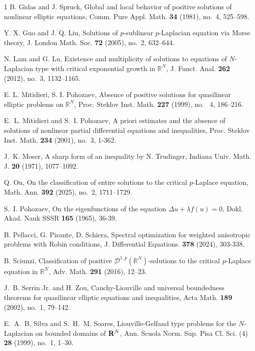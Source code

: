 \documentclass[reqno, 11pt]{amsart} %
\numberwithin{equation}{section}
\theoremstyle{definition}
\begin{document}
\begin{thebibliography}{1}
	B. Gidas and J. Spruck, Global and local behavior of positive solutions of nonlinear elliptic equations, Comm. Pure Appl. Math. {\bf 34} (1981), no.~4, 525--598.

     Y. X. Guo and J. Q. Liu, Solutions of $p$-sublinear $p$-Laplacian equation via Morse theory, J. London Math. Soc. {\bf 72} (2005), no.~2, 632--644.

     N. Lam and G. Lu, Existence and multiplicity of solutions to equations of $N$-Laplacian type with critical exponential growth in $\mathbb{R}^N$, J. Funct. Anal. {\bf 262} (2012), no.~3, 1132--1165.

     E. L. Mitidieri, S. I. Pohozaev, Absence of positive solutions for quasilinear elliptic problems on $\mathbb{R}^N$, Proc. Steklov Inst. Math. {\bf 227 } (1999), no. ~4, 186–216.

     E.~L. Mitidieri and S.~I. Pohozaev, A priori estimates and the absence of solutions of nonlinear partial differential equations and inequalities, Proc. Steklov Inst. Math. {\bf 234} (2001), no.~3, 1-362.

    J.~K. Moser, A sharp form of an inequality by N. Trudinger, Indiana Univ. Math. J. {\bf 20} (1971), 1077--1092.

     Q. Ou, On the classification of entire solutions to the critical $p$-Laplace equation, Math. Ann. {\bf 392} (2025), no.~2, 1711--1729.

    S.~I. Pohozaev, On the eigenfunctions of the equation $\Delta u+\lambda f(u)=0$, Dokl. Akad. Nauk SSSR {\bf 165} (1965), 36-39.

     B. Pellacci, G. Pisante, D. Schiera, Spectral optimization for weighted anisotropic problems with Robin conditions, J. Differential Equations.  {\bf 378} (2024), 303-338.

     B. Sciunzi, Classification of positive $\mathcal{D}^{1,p}(\mathbb{R}^N)$-solutions to the critical $p$-Laplace equation in $\mathbb{R}^N$, Adv. Math. {\bf 291} (2016), 12--23.

       J.~B. Serrin Jr. and H. Zou, Cauchy-Liouville and universal boundedness theorems for quasilinear elliptic equations and inequalities, Acta Math. {\bf 189} (2002), no.~1, 79--142.

      E.~A.~B. Silva and S.~H.~M. Soares, Liouville-Gelfand type problems for the $N$-Laplacian on bounded domains of ${\bf R}^N$, Ann. Scuola Norm. Sup. Pisa Cl. Sci. (4) {\bf 28} (1999), no.~1, 1--30.


\end{thebibliography}
\end{document}

